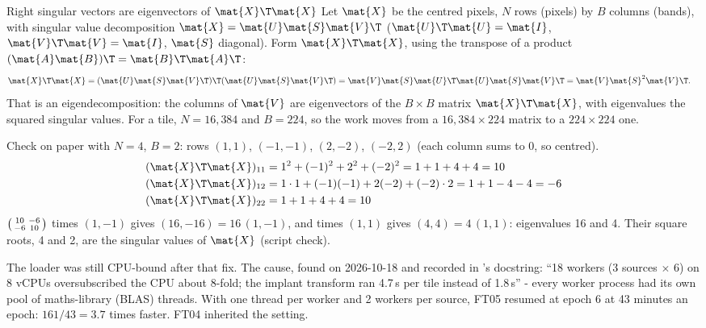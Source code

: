 \begin{worked}[label={we:ftruns:svd}]{Right singular vectors are eigenvectors of \texorpdfstring{$\mat{X}\T\mat{X}$}{XtX}}
Let $\mat{X}$ be the centred pixels, $N$ rows (pixels) by $B$ columns (bands), with singular value decomposition
$\mat{X} = \mat{U}\mat{S}\mat{V}\T$ ($\mat{U}\T\mat{U} = \mat{I}$, $\mat{V}\T\mat{V} = \mat{I}$, $\mat{S}$ diagonal).
Form $\mat{X}\T\mat{X}$, using the transpose of a product $(\mat{A}\mat{B})\T = \mat{B}\T\mat{A}\T$:
\begin{align*}
\mat{X}\T\mat{X} &= (\mat{U}\mat{S}\mat{V}\T)\T (\mat{U}\mat{S}\mat{V}\T)
 = \mat{V}\mat{S}\mat{U}\T\mat{U}\mat{S}\mat{V}\T
 = \mat{V}\mat{S}^2\mat{V}\T .
\end{align*}
That is an eigendecomposition: the columns of $\mat{V}$ are eigenvectors of the $B \times B$ matrix $\mat{X}\T\mat{X}$,
with eigenvalues the squared singular values. For a tile, $N = 16{,}384$ and $B = 224$, so the work moves from a
$16{,}384 \times 224$ matrix to a $224 \times 224$ one.

Check on paper with $N = 4$, $B = 2$: rows $(1, 1)$, $(-1, -1)$, $(2, -2)$, $(-2, 2)$ (each column sums to 0, so
centred).
\begin{align*}
(\mat{X}\T\mat{X})_{11} &= 1^2 + (-1)^2 + 2^2 + (-2)^2 = 1 + 1 + 4 + 4 = 10\\
(\mat{X}\T\mat{X})_{12} &= 1 \cdot 1 + (-1)(-1) + 2(-2) + (-2) \cdot 2 = 1 + 1 - 4 - 4 = -6\\
(\mat{X}\T\mat{X})_{22} &= 1 + 1 + 4 + 4 = 10
\end{align*}
$\begin{psmallmatrix}10 & -6\\ -6 & 10\end{psmallmatrix}$ times $(1, -1)$ gives $(16, -16) = 16\,(1, -1)$, and times
$(1, 1)$ gives $(4, 4) = 4\,(1, 1)$: eigenvalues 16 and 4. Their square roots, 4 and 2, are the singular values of
$\mat{X}$ (script check\tagC).
\end{worked}

The loader was still CPU-bound after that fix. The cause, found on 2026-10-18 and recorded in
's docstring: ``18 workers (3 sources $\times$ 6) on 8 vCPUs oversubscribed the CPU about
8-fold; the implant transform ran 4.7\,s per tile instead of 1.8\,s'' - every worker process had its own pool of
maths-library (BLAS) threads. With one thread per worker and 2 workers per source, FT05 resumed at epoch 6 at 43 minutes
an epoch: $161 / 43 = 3.7$ times faster. FT04 inherited the setting.

